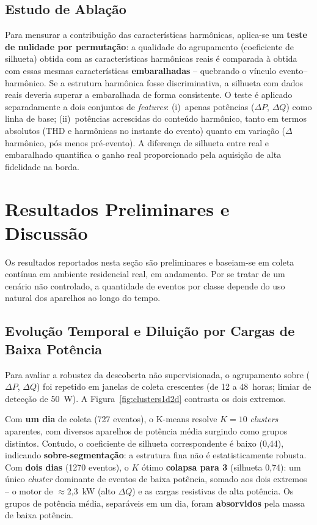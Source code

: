 \documentclass[12pt]{article}
\begin{document}
\subsection{Estudo de Abla\c{c}\~ao}

Para mensurar a contribui\c{c}\~ao das caracter\'isticas harm\^onicas, aplica-se
um \textbf{teste de nulidade por permuta\c{c}\~ao}: a qualidade do agrupamento
(coeficiente de silhueta) obtida com as caracter\'isticas harm\^onicas reais \'e
comparada \`a obtida com essas mesmas caracter\'isticas \textbf{embaralhadas} --
quebrando o v\'inculo evento--harm\^onico. Se a estrutura harm\^onica fosse
discriminativa, a silhueta com dados reais deveria superar a embaralhada de forma
consistente. O teste \'e aplicado separadamente a dois conjuntos de
\textit{features}: (i)~apenas pot\^encias ($\Delta P$, $\Delta Q$) como linha de
base; (ii)~pot\^encias acrescidas do conte\'udo harm\^onico, tanto em termos
absolutos (THD e harm\^onicas no instante do evento) quanto em varia\c{c}\~ao
($\Delta$harm\^onico, p\'os menos pr\'e-evento). A diferen\c{c}a de silhueta entre
real e embaralhado quantifica o ganho real proporcionado pela aquisi\c{c}\~ao de
alta fidelidade na borda.


\section{Resultados Preliminares e Discuss\~ao}

Os resultados reportados nesta se\c{c}\~ao s\~ao preliminares e baseiam-se em
coleta cont\'inua em ambiente residencial real, em andamento. Por se tratar de um
cen\'ario n\~ao controlado, a quantidade de eventos por classe depende do uso
natural dos aparelhos ao longo do tempo.

\subsection{Evolu\c{c}\~ao Temporal e Dilui\c{c}\~ao por Cargas de Baixa
Pot\^encia}

Para avaliar a robustez da descoberta n\~ao supervisionada, o agrupamento sobre
($\Delta P$, $\Delta Q$) foi repetido em janelas de coleta crescentes (de 12 a
48~horas; limiar de detec\c{c}\~ao de 50~W). A Figura~\ref{fig:clusters1d2d}
contrasta os dois extremos.

Com \textbf{um dia} de coleta (727 eventos), o K-means resolve $K=10$
\textit{clusters} aparentes, com diversos aparelhos de pot\^encia m\'edia surgindo
como grupos distintos. Contudo, o coeficiente de silhueta correspondente \'e baixo
(0{,}44), indicando \textbf{sobre-segmenta\c{c}\~ao}: a estrutura fina n\~ao \'e
estatisticamente robusta. Com \textbf{dois dias} (1270 eventos), o $K$ \'otimo
\textbf{colapsa para 3} (silhueta 0{,}74): um \'unico \textit{cluster} dominante de
eventos de baixa pot\^encia, somado aos dois extremos -- o motor de
$\approx$2{,}3~kW (alto $\Delta Q$) e as cargas resistivas de alta pot\^encia. Os
grupos de pot\^encia m\'edia, separ\'aveis em um dia, foram \textbf{absorvidos}
pela massa de baixa pot\^encia.
\end{document}
